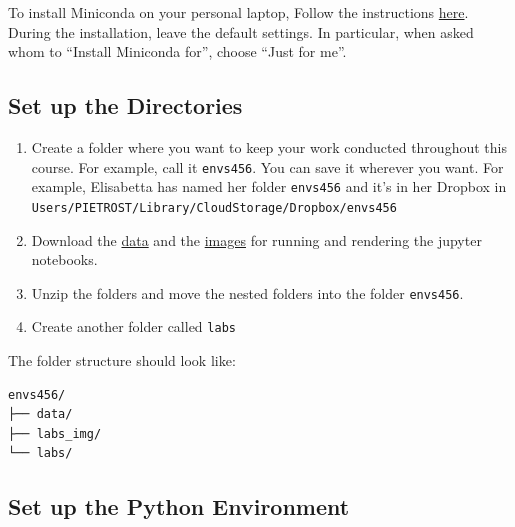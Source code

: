 \documentclass[
  letterpaper,
  DIV=11,
  numbers=noendperiod]{scrreprt}
\providecommand{\tightlist}{%
  \setlength{\itemsep}{0pt}\setlength{\parskip}{0pt}}\usepackage{longtable,booktabs,array}
\begin{document}
To install Miniconda on your personal laptop, Follow the instructions
\href{https://docs.conda.io/projects/miniconda/en/latest/miniconda-install.html}{here}.
During the installation, leave the default settings. In particular, when
asked whom to ``Install Miniconda for'', choose ``Just for me''.

\subsection*{Set up the Directories}\label{set-up-the-directories-1}

\begin{enumerate}
\def\labelenumi{\arabic{enumi}.}
\tightlist
\item
  Create a folder where you want to keep your work conducted throughout
  this course. For example, call it \texttt{envs456}. You can save it
  wherever you want. For example, Elisabetta has named her folder
  \texttt{envs456} and it's in her Dropbox in
  \texttt{Users/PIETROST/Library/CloudStorage/Dropbox/envs456}
\item
  Download the
  \href{https://minhaskamal.github.io/DownGit/\#/home?url=https://github.com/GDSL-UL/wma/tree/main/data}{data}
  and the
  \href{https://minhaskamal.github.io/DownGit/\#/home?url=https://github.com/GDSL-UL/wma/tree/main/labs_img}{images}
  for running and rendering the jupyter notebooks.
\item
  Unzip the folders and move the nested folders into the folder
  \texttt{envs456}.
\item
  Create another folder called \texttt{labs}
\end{enumerate}

The folder structure should look like:

\begin{verbatim}
envs456/
├── data/
├── labs_img/
└── labs/
\end{verbatim}

\subsection*{Set up the Python
Environment}\label{set-up-the-python-environment-1}
\end{document}
